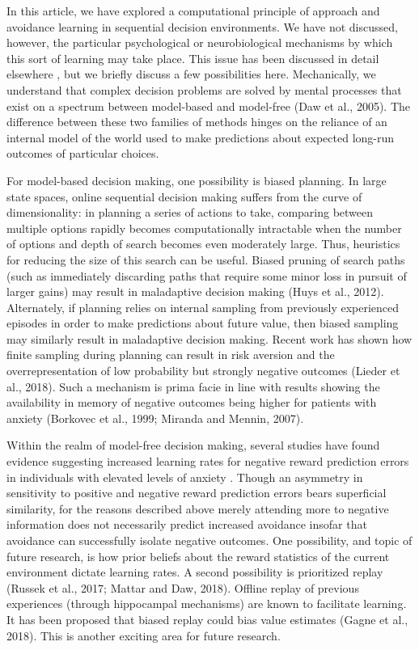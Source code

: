 \documentclass[11pt]{article} %
\begin{document}
In this article, we have explored a computational principle of approach and
avoidance learning in sequential decision environments. We have not discussed,
however, the particular psychological or neurobiological mechanisms by which this
sort of learning may take place. This issue has been discussed in detail elsewhere
\citep{Bishop2018}, but we briefly discuss a few possibilities here. Mechanically,
we understand that complex decision problems are solved by mental processes that
exist on a spectrum between model-based and model-free (Daw et al., 2005). The
difference between these two families of methods hinges on the reliance of an
internal model of the world used to make predictions about expected long-run
outcomes of particular choices.

For model-based decision making, one possibility is biased planning. In large
state spaces, online sequential decision making suffers from the curve of
dimensionality: in planning a series of actions to take, comparing between
multiple options rapidly becomes computationally intractable when the number of
options and depth of search becomes even moderately large. Thus, heuristics for
reducing the size of this search can be useful. Biased pruning of search paths
(such as immediately discarding paths that require some minor loss in pursuit of
larger gains) may result in maladaptive decision making (Huys et al., 2012).
Alternately, if planning relies on internal sampling from previously experienced
episodes in order to make predictions about future value, then biased sampling
may similarly result in maladaptive decision making. Recent work has shown how
finite sampling during planning can result in risk aversion and the overrepresentation
of low probability but strongly negative outcomes (Lieder et al., 2018). Such a
mechanism is prima facie in line with results showing the availability in memory
of negative outcomes being higher for patients with anxiety (Borkovec et al., 1999;
Miranda and Mennin, 2007).

Within the realm of model-free decision making, several studies have found evidence
suggesting increased learning rates for negative reward prediction errors in
individuals with elevated levels of anxiety \citep{Aylward, Huang2017, Harle2017
garrett2018}. Though an asymmetry in sensitivity to
positive and negative reward prediction errors bears superficial similarity, for
the reasons described above merely attending more to negative information does not
necessarily predict increased avoidance insofar that avoidance can successfully
isolate negative outcomes. One possibility, and topic of future research, is how
prior beliefs about the reward statistics of the current environment dictate
learning rates. A second possibility is prioritized replay (Russek et al., 2017;
Mattar and Daw, 2018). Offline replay of previous experiences (through hippocampal
mechanisms) are known to facilitate learning. It has been proposed that biased
replay could bias value estimates (Gagne et al., 2018). This is another exciting
area for future research.
\end{document}
